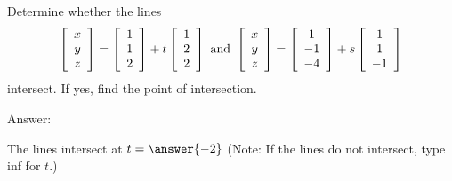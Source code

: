 \documentclass{ximera}
\begin{document}


\begin{problem}
  Determine whether the lines
  \begin{equation*}
    \startmat{c} x \\ y \\ z \stopmat
    = \startmat{c} 1 \\ 1 \\ 2 \stopmat
    + t \startmat{c} 1 \\ 2 \\ 2 \stopmat
    \quad\mbox{and}\quad
    \startmat{c} x \\ y \\ z \stopmat
    = \startmat{c} 1 \\ -1 \\ -4 \stopmat
    + s \startmat{c} 1 \\ 1 \\ -1 \stopmat
  \end{equation*}
  intersect. If yes, find the point of intersection.

  Answer:

  The lines intersect at $t=\answer{-2}$ (Note: If the lines do not intersect, type inf for $t$.)
\end{problem}
\end{document}
